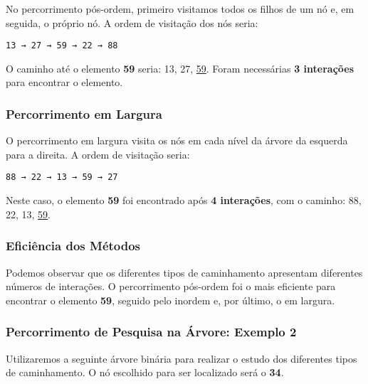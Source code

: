 \documentclass{article}
\begin{document}
No percorrimento pós-ordem, primeiro visitamos todos os filhos de um nó e, em seguida, o próprio nó. A ordem de visitação dos nós seria:

\begin{verbatim}
13 → 27 → 59 → 22 → 88
\end{verbatim}

\noindent
O caminho até o elemento \textbf{59} seria: 13, 27, \underline{59}. Foram necessárias \textbf{3 interações} para encontrar o elemento.

\subsubsection{Percorrimento em Largura}

O percorrimento em largura visita os nós em cada nível da árvore da esquerda para a direita. A ordem de visitação seria:

\begin{verbatim}
88 → 22 → 13 → 59 → 27
\end{verbatim}

\noindent
Neste caso, o elemento \textbf{59} foi encontrado após \textbf{4 interações}, com o caminho: 88, 22, 13, \underline{59}.

\subsubsection{Eficiência dos Métodos}

Podemos observar que os diferentes tipos de caminhamento apresentam diferentes números de interações. O percorrimento pós-ordem foi o mais eficiente para encontrar o elemento \textbf{59}, seguido pelo inordem e, por último, o em largura.

\begin{center}
\subsubsection{Percorrimento de Pesquisa na Árvore: Exemplo 2}

Utilizaremos a seguinte árvore binária para realizar o estudo dos diferentes tipos de caminhamento. O nó escolhido para ser localizado será o \textbf{34}.

\begin{center}
\end{center}
\end{center}
\end{document}
